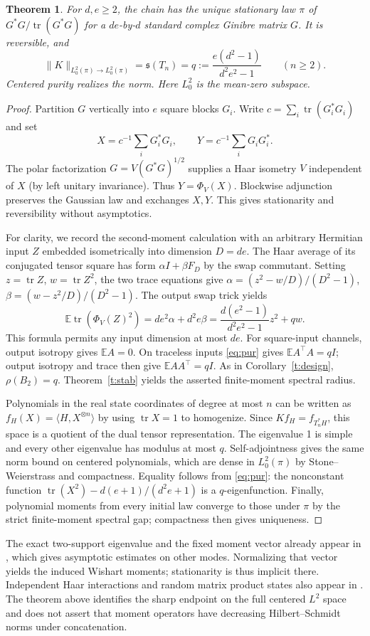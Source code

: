 \documentclass[11pt]{article}
\newtheorem{theorem}{Theorem}
\DeclareMathOperator{\tr}{tr}
\newcommand{\E}{\mathbb E}
\newcommand{\s}{\mathfrak s}
\begin{document}
\begin{theorem}\label{t:haar}
For $d,e\ge2$, the chain has the unique stationary law $\pi$ of $G^*G/\tr(G^*G)$ for a $de$-by-$d$ standard complex Ginibre matrix $G$. It is reversible, and
\[
 \|K\|_{L^2_0(\pi)\to L^2_0(\pi)}
 =\s(T_n)=q:=\frac{e(d^2-1)}{d^2e^2-1}\qquad(n\ge2).
\]
Centered purity realizes the norm. Here $L^2_0$ is the mean-zero subspace.
\end{theorem}
\begin{proof}
Partition $G$ vertically into $e$ square blocks $G_i$. Write $c=\sum_i\tr(G_i^*G_i)$ and set
\[
 X=c^{-1}\sum_iG_i^*G_i,\qquad Y=c^{-1}\sum_iG_iG_i^* .
\]
The polar factorization $G=V(G^*G)^{1/2}$ supplies a Haar isometry $V$ independent of $X$ (by left unitary invariance). Thus $Y=\Phi_V(X)$. Blockwise adjunction preserves the Gaussian law and exchanges $X,Y$. This gives stationarity and reversibility without asymptotics.

For clarity, we record the second-moment calculation with an arbitrary Hermitian input $Z$ embedded isometrically into dimension $D=de$. The Haar average of its conjugated tensor square has form $\alpha I+\beta F_D$ by the swap commutant. Setting $z=\tr Z$, $w=\tr Z^2$, the two trace equations give $\alpha=(z^2-w/D)/(D^2-1)$, $\beta=(w-z^2/D)/(D^2-1)$. The output swap trick yields
\begin{equation}\label{eq:pur}
 \E\tr(\Phi_V(Z)^2)=de^2\alpha+d^2e\beta
 =\frac{d(e^2-1)}{d^2e^2-1}z^2+q w .
\end{equation}
This formula permits any input dimension at most $de$. For square-input channels, output isotropy gives $\E A=0$. On traceless inputs \eqref{eq:pur} gives $\E A^\top A=qI$; output isotropy and trace then give $\E AA^\top=qI$. As in Corollary~\ref{t:design}, $\rho(B_2)=q$. Theorem~\ref{t:stab} yields the asserted finite-moment spectral radius.

Polynomials in the real state coordinates of degree at most $n$ can be written as $f_H(X)=\langle H,X^{\otimes n}\rangle$ by using $\tr X=1$ to homogenize. Since $Kf_H=f_{T_n^* H}$, this space is a quotient of the dual tensor representation. The eigenvalue 1 is simple and every other eigenvalue has modulus at most $q$. Self-adjointness gives the same norm bound on centered polynomials, which are dense in $L^2_0(\pi)$ by Stone--Weierstrass and compactness. Equality follows from \eqref{eq:pur}: the nonconstant function $\tr(X^2)-d(e+1)/(d^2 e+1)$ is a $q$-eigenfunction. Finally, polynomial moments from every initial law converge to those under $\pi$ by the strict finite-moment spectral gap; compactness then gives uniqueness.
\end{proof}
The exact two-support eigenvalue and the fixed moment vector already appear in \cite{duschenes}, which gives asymptotic estimates on other modes. Normalizing that vector yields the induced Wishart moments; stationarity is thus implicit there. Independent Haar interactions and random matrix product states also appear in \cite{movassagh,rmps}. The theorem above identifies the sharp endpoint on the full centered $L^2$ space and does not assert that moment operators have decreasing Hilbert--Schmidt norms under concatenation.
\end{document}
